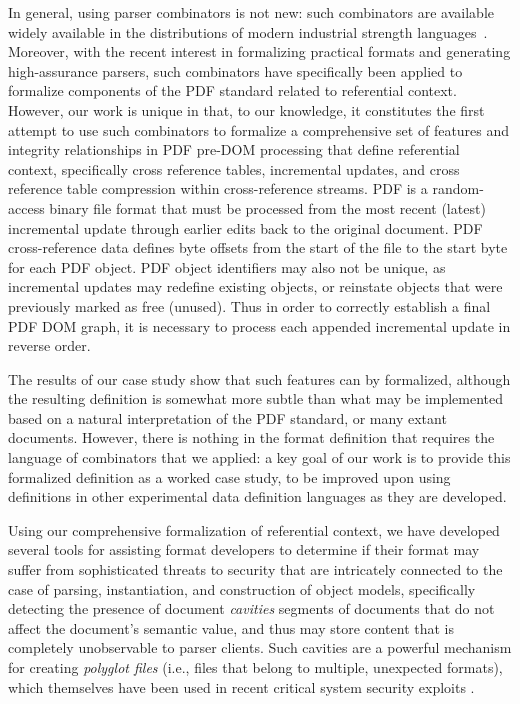 In general, using parser combinators is not new: such combinators are
available widely available in the distributions of modern industrial
strength languages~.
%
Moreover, with the recent interest in formalizing practical formats
and generating high-assurance parsers, such combinators have
specifically been applied to formalize components of the
PDF standard related to referential context.
%
However, our work is unique in that, to our knowledge, it constitutes
the first attempt to use such combinators to formalize a comprehensive
set of features and integrity relationships in PDF pre-DOM processing 
that define referential context, specifically cross reference tables, 
incremental updates, and cross reference table compression within 
cross-reference streams. PDF is a random-access binary file format that must be 
processed from the most recent (latest) incremental update through earlier edits 
back to the original document.  PDF cross-reference data defines byte offsets from the start of the file to
the start byte for each PDF object. PDF object identifiers may also not 
be unique, as incremental updates may redefine existing objects, or reinstate 
objects that were previously marked as free (unused). Thus in order to correctly
establish a final PDF DOM graph, it is necessary to process each appended incremental update
in reverse order.

The results of our case study show that such features can by formalized, 
although the resulting definition is somewhat more subtle than what may be 
implemented based on a natural interpretation of the PDF standard, or many extant documents. 
%
However, there is nothing in the format definition
that requires the language of combinators that we applied: a key goal
of our work is to provide this formalized definition as a worked case
study, to be improved upon using definitions in other experimental
data definition languages as they are developed.

Using our comprehensive formalization of referential context, we have
developed several tools for assisting format developers to determine
if their format may suffer from sophisticated threats to security that
are intricately connected to the case of parsing, instantiation, and construction of object models,
specifically detecting the presence of document \emph{cavities}
segments of documents that do not affect the document's semantic
value, and thus may store content that is completely unobservable to
parser clients.
%
Such cavities are a powerful mechanism for creating \emph{polyglot
  files} (i.e., files that belong to multiple, unexpected formats),
which themselves have been used in recent critical system security
exploits .

